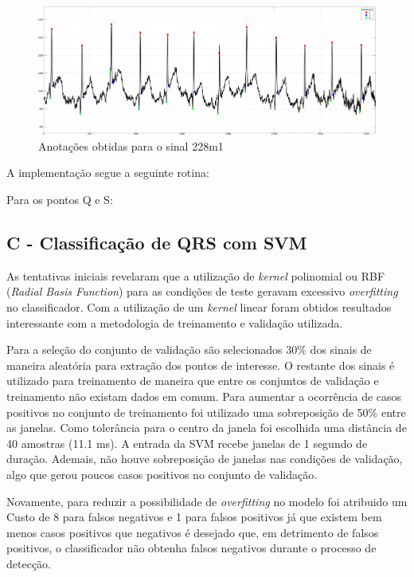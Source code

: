 \documentclass{article}
\begin{document}
\begin{figure}[H]
	\begin{center}
		\includegraphics[scale=0.3]{../qrs_228m1.png}
		\caption{Anotações obtidas para o sinal 228m1}
		\label{fig:qrs_228m1}
	\end{center}
\end{figure}  

A implementação segue a seguinte rotina:


Para os pontos Q e S:

\newpage
\subsection*{C - Classificação de QRS com SVM}
As tentativas iniciais revelaram que a utilização de \textit{kernel} polinomial ou RBF (\textit{Radial Basis Function}) para as condições de teste geravam excessivo \textit{overfitting} no classificador. Com a utilização de um \textit{kernel} linear foram obtidos resultados interessante com a metodologia de treinamento e validação utilizada.

Para a seleção do conjunto de validação são selecionados 30\% dos sinais de maneira aleatória para extração dos pontos de interesse. O restante dos sinais é utilizado para treinamento de maneira que entre os conjuntos de validação e treinamento não existam dados em comum. Para aumentar a ocorrência de casos positivos no conjunto de treinamento foi utilizado uma sobreposição de 50\% entre as janelas. Como tolerância para o centro da janela foi escolhida uma distância de 40 amostras (11.1 ms). A entrada da SVM recebe janelas de 1 segundo de duração. Ademais, não houve sobreposição de janelas nas condições de validação, algo que gerou poucos casos positivos no conjunto de validação.

Novamente, para reduzir a possibilidade de \textit{overfitting} no modelo foi atribuido um Custo de 8 para falsos negativos e 1 para falsos positivos já que existem bem menos casos positivos que negativos é desejado que, em detrimento de falsos positivos, o classificador não obtenha falsos negativos durante o processo de detecção.
\end{document}
